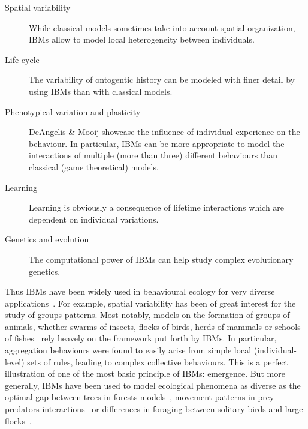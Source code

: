         \begin{description}
            \item[Spatial variability] {While classical models sometimes take into account spatial organization, IBMs allow to model local heterogeneity between individuals.}
            \item[Life cycle] {The variability of ontogentic history can be modeled with finer detail by using IBMs than with classical models.}
            \item[Phenotypical variation and plasticity] {DeAngelis \& Mooij showcase the influence of individual experience on the behaviour. In particular, IBMs can be more appropriate to model the interactions of multiple (more than three) different behaviours than classical (game theoretical) models.}
            \item[Learning] {Learning is obviously a consequence of lifetime interactions which are dependent on individual variations.}
            \item[Genetics and evolution] {The computational power of IBMs can help study complex evolutionary genetics.}
        \end{description}

        Thus IBMs have been widely used in behavioural ecology for very diverse applications~\parencite{DeAngelis2005}. For example, spatial variability has been of great interest for the study of groups patterns. Most notably, models on the formation of groups of animals, whether swarms of insects, flocks of birds, herds of mammals or schools of fishes~\parencite{Huth1992, Reynolds1992, Gueron1996, Couzin2002} rely heavely on the framework put forth by IBMs. In particular, aggregation behaviours were found to easily arise from simple local (individual-level) sets of rules, leading to complex collective behaviours. This is a perfect illustration of one of the most basic principle of IBMs: emergence. But more generally, IBMs have been used to model ecological phenomena as diverse as the optimal gap between trees in forests models~\parencite{Botkin1972}, movement patterns in prey-predators interactions~\parencite{Smith1991} or differences in foraging between solitary birds and large flocks~\parencite{Toquenaga1995}.

